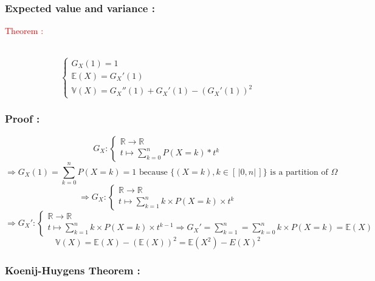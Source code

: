 \documentclass[a4paper,12pt]{article}
\begin{document}
\subsubsection{Expected value and variance :}

\textcolor{red}{Theorem :}

 \\
\[
\begin{cases}
    G_X(1) = 1 \\
    \mathbb{E}(X) = G_X'(1)\\
    \mathbb{V}(X) = G_X''(1) + G_X'(1) - (G_X'(1))^2
\end{cases}
\]
\bigskip
\subsubsection{Proof :}

\[
  G_X : \begin{cases}
    \mathbb{R} \rightarrow \mathbb{R}\\
 t \mapsto \sum_{k = 0}^{n}{P(X = k) * t^k}
\end{cases}
\]
\[
\Rightarrow G_X(1) = \sum_{k = 0}^{n}{P(X = k) = 1} \text{  because } \{(X = k), k\in  \left[\,|0, n|\,\right]\} \text{ is a partition of } \Omega
\]
\[
\Rightarrow G_X : \begin{cases}
    \mathbb{R} \rightarrow \mathbb{R} \\
    t \mapsto \sum_{k=1}^{n}{k \times P(X = k) \times t^{k}} 
\end{cases} 
\]
\[
\Rightarrow G_X' : \begin{cases}
    \mathbb{R} \rightarrow \mathbb{R} \\
    t \mapsto \sum_{k= 1}^{n}{k \times P(X  = k) \times t^{k-1}} \Rightarrow G_X' = \sum_{k= 1}^{n} = \sum_{k= 0}^{n}{k \times P(X  = k)} = \mathbb{E}(X)
\end{cases}
\]
\[
\mathbb{V}(X) = \mathbb{E}(X)-(\mathbb{E}(X))^2 = \mathbb{E}(X^2) - E(X)^2
\]
\bigskip
\subsubsection{Koenij-Huygens Theorem :}
\end{document}
